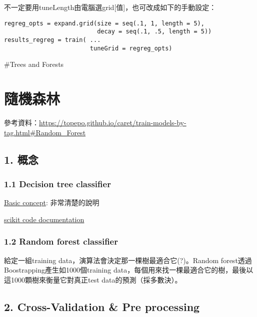 \documentclass[]{book}
\begin{document}
不一定要用tuneLength由電腦選grid{[}值{]}，也可改成如下的手動設定：

\begin{verbatim}
regreg_opts = expand.grid(size = seq(.1, 1, length = 5),
                          decay = seq(.1, .5, length = 5)) 
results_regreg = train( ...
                        tuneGrid = regreg_opts)
\end{verbatim}

\#Trees and Forests

\section{隨機森林}

參考資料：\url{https://topepo.github.io/caret/train-models-by-tag.html\#Random_Forest}

\subsection{1. 概念}

\hypertarget{decision-tree-classifier}{%
\subsubsection{1.1 Decision tree classifier}\label{decision-tree-classifier}}

\href{https://medium.com/machine-learning-101/chapter-3-decision-trees-theory-e7398adac567}{Basic concept}: 非常清楚的說明

\href{https://scikit-learn.org/stable/modules/generated/sklearn.tree.DecisionTreeClassifier.html\#sklearn.tree.DecisionTreeClassifier}{scikit code documentation}

\hypertarget{random-forest-classifier}{%
\subsubsection{1.2 Random forest classifier}\label{random-forest-classifier}}

給定一組training data，演算法會決定那一棵樹最適合它(?)。Random forest透過Boostrapping產生如1000個training data，每個用來找一棵最適合它的樹，最後以這1000顆樹來衡量它對真正test data的預測（採多數決）。

\hypertarget{cross-validation-pre-processing}{%
\subsection{2. Cross-Validation \& Pre processing}\label{cross-validation-pre-processing}}
\end{document}
